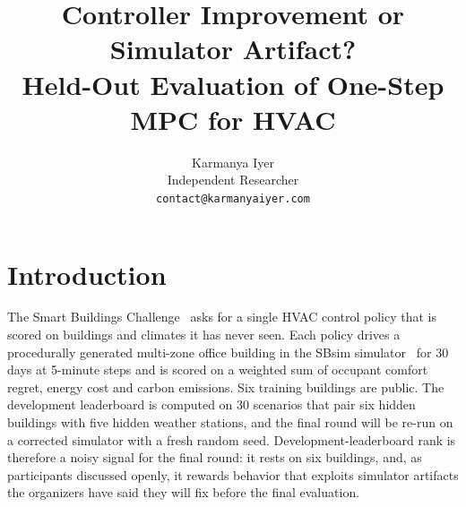 \documentclass{article}
\title{Controller Improvement or Simulator Artifact?\\ Held-Out Evaluation of One-Step MPC for HVAC}
\author{%
  Karmanya Iyer \\
  Independent Researcher \\
  \texttt{contact@karmanyaiyer.com} \\
}
\begin{document}
\maketitle

\begin{abstract}

\end{abstract}

\section{Introduction}

The Smart Buildings Challenge~\citep{goldfeder2026smart} asks for a single HVAC control policy that is scored on buildings and climates it has never seen. Each policy drives a procedurally generated multi-zone office building in the SBsim simulator~\citep{goldfeder2024smart} for 30 days at 5-minute steps and is scored on a weighted sum of occupant comfort regret, energy cost and carbon emissions. Six training buildings are public. The development leaderboard is computed on 30 scenarios that pair six hidden buildings with five hidden weather stations, and the final round will be re-run on a corrected simulator with a fresh random seed. Development-leaderboard rank is therefore a noisy signal for the final round: it rests on six buildings, and, as participants discussed openly, it rewards behavior that exploits simulator artifacts the organizers have said they will fix before the final evaluation.
\end{document}
